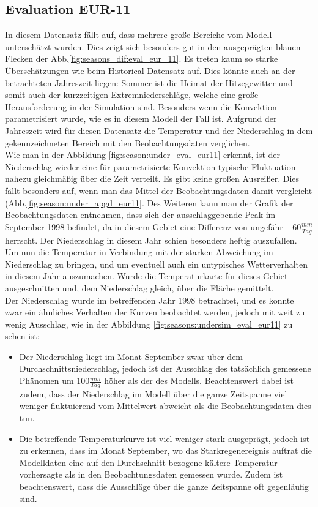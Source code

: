 \subsection{Evaluation EUR-11}\label{sec:eval_eur_11}
In diesem Datensatz fällt auf, dass mehrere große Bereiche vom Modell unterschätzt wurden. Dies zeigt sich besonders gut in den ausgeprägten blauen Flecken der Abb.\ref{fig:seasons_dif:eval_eur_11}. Es treten kaum so starke Überschätzungen wie beim Historical Datensatz auf. Dies könnte auch an der betrachteten Jahreszeit liegen: Sommer ist die Heimat der Hitzegewitter und somit auch der kurzzeitigen Extremniederschläge, welche eine große Herausforderung in der Simulation sind. Besonders wenn die Konvektion parametrisiert wurde, wie es in diesem Modell der Fall ist. Aufgrund der Jahreszeit wird für diesen Datensatz die Temperatur und der Niederschlag in dem gekennzeichneten Bereich mit den Beobachtungsdaten verglichen.\\
Wie man in der Abbildung \ref{fig:season:under_eval_eur11} erkennt, ist der Niederschlag wieder eine für parametrisierte Konvektion typische Fluktuation nahezu gleichmäßig über die Zeit verteilt. Es gibt keine großen Ausreißer. Dies fällt besonders auf, wenn man das Mittel der Beobachtungsdaten damit vergleicht (Abb.\ref{fig:season:under_apgd_eur11}. Des Weiteren kann man der Grafik der Beobachtungsdaten entnehmen, dass sich der ausschlaggebende Peak im September 1998 befindet, da in diesem Gebiet eine Differenz von ungefähr $-60\frac{mm}{Tag}$ herrscht. Der Niederschlag in diesem Jahr schien besonders heftig auszufallen. Um nun die Temperatur in Verbindung mit der starken Abweichung im Niederschlag zu bringen, und um eventuell auch ein untypisches Wetterverhalten in diesem Jahr auszumachen. Wurde die Temperaturkarte für dieses Gebiet ausgeschnitten und, dem Niederschlag gleich, über die Fläche gemittelt.\\
Der Niederschlag wurde im betreffenden Jahr 1998 betrachtet, und es konnte zwar ein ähnliches Verhalten der Kurven beobachtet werden, jedoch mit weit zu wenig Ausschlag, wie in der Abbildung \ref{fig:seasons:undersim_eval_eur11} zu sehen ist:\\
\begin{itemize}
	\item Der Niederschlag liegt im Monat September zwar über dem Durchschnittsniederschlag, jedoch ist der Ausschlag des tatsächlich gemessene Phänomen um $100\frac{mm}{Tag}$ höher als der des Modells. Beachtenswert dabei ist zudem, dass der Niederschlag im Modell über die ganze Zeitspanne viel weniger fluktuierend vom Mittelwert abweicht als die Beobachtungsdaten dies tun.
	\item Die betreffende Temperaturkurve ist viel weniger stark ausgeprägt, jedoch ist zu erkennen, dass im Monat September, wo das Starkregenereignis auftrat die Modelldaten eine auf den Durchschnitt bezogene kältere Temperatur vorhersagte als in den Beobachtungsdaten gemessen wurde. Zudem ist beachtenswert, dass die Ausschläge über die ganze Zeitspanne oft gegenläufig sind.
\end{itemize}

